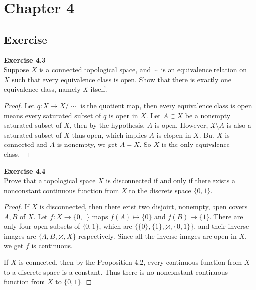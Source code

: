\documentclass[12pt, a4paper]{article}
\theoremstyle{plain}
\newenvironment{exercise}[2][Exercise]
    { \begin{mdframed}[backgroundcolor=gray!20] \textbf{#1 #2} \\}
    {  \end{mdframed}}
\begin{document}
\section{Chapter 4}
\subsection{Exercise}
	
\begin{exercise}{4.3}
	Suppose $X$ is a connected topological space, and $\sim$ is an equivalence relation on $X$ such that every equivalence class is open. Show that there is exactly one equivalence class, namely $X$ itself.
\end{exercise}
	\begin{proof}
	Let $q:X\rightarrow X/\sim$ is the quotient map, then every equivalence class is open means every saturated subset of $q$ is open in $X$. Let $A\subset X$ be a nonempty saturated subset of $X$, then by the hypothesis, $A$ is open. However, $X\setminus A$ is also a saturated subset of $X$ thus open, which implies $A$ is clopen in $X$. But $X$ is connected and $A$ is nonempty, we get $A=X$. So $X$ is the only equivalence class.
	\end{proof}

\begin{exercise}{4.4}
Prove that a topological space $X$ is disconnected if and only if there exists a nonconstant continuous function from $X$ to the discrete space $\{0,1\}$.
\end{exercise}
	\begin{proof}
	If $X$ is disconnected, then there exist two disjoint, nonempty, open covers $A,B$ of $X$. Let $f:X\rightarrow\{0,1\}$ maps $f(A)\mapsto \{0\}$ and $f(B)\mapsto\{1\}$. There are only four open subsets of $\{0,1\}$, which are $\{\{0\},\{1\},\varnothing,\{0,1\}\}$, and their inverse images are $\{A,B,\varnothing,X\}$ respectively. Since all the inverse images are open in $X$, we get $f$ is continuous.
	
	If $X$ is connected, then by the Proposition 4.2, every continuous function from $X$ to a discrete space is a constant. Thus there is no nonconstant continuous function from $X$ to $\{0,1\}$.
	\end{proof}
\end{document}
